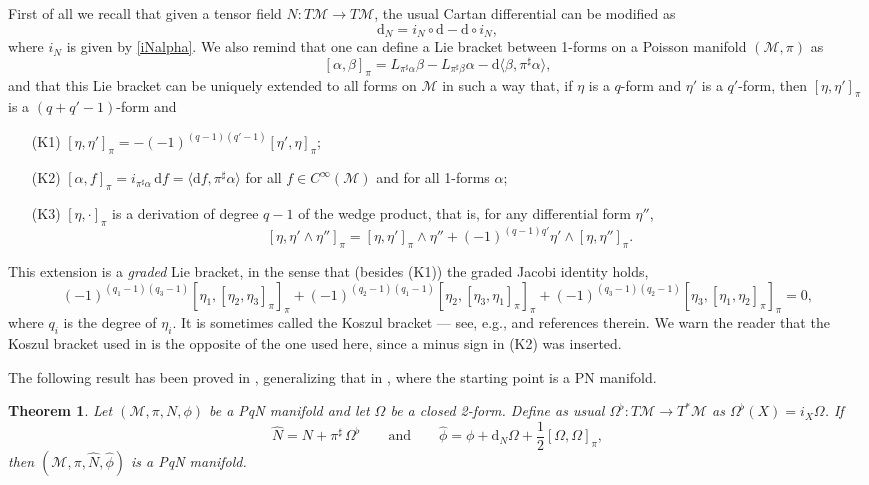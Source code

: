 \documentclass[12pt]{article}
\newtheorem{theorem}{Theorem}%
\def\d{{\mathrm d}}
\def\M{{\mathcal M}}
\begin{document}
First of all we recall that given a tensor field $N:T\M\to T\M$, the usual Cartan differential can be modified as 
\begin{equation}
\label{eq:dNd}
\d_N=i_N\circ \d-\d\circ i_N,
\end{equation}
where $i_N$ is given by \eqref{iNalpha}.
We also remind that one can define a Lie bracket between 1-forms on a Poisson manifold $(\M,\pi)$ as
\begin{equation}
\label{eq:liealgpi}
[\alpha,\beta]_\pi=L_{\pi^\sharp\alpha}\beta-L_{\pi^\sharp\beta}\alpha-\d\langle\beta,\pi^\sharp\alpha\rangle,
\end{equation}
and that this Lie bracket 
can be uniquely extended to all forms on $\M$ in such a way that, if $\eta$ is a $q$-form and $\eta'$ is a $q'$-form, then 
$[\eta,\eta']_\pi$ is a $(q+q'-1)$-form and 
\begin{itemize}
\item[(K1)] $[\eta,\eta']_\pi=-(-1)^{(q-1)(q'-1)}[\eta',\eta]_\pi$; 
\item[(K2)] $[\alpha,f]_\pi=i_{\pi^\sharp\alpha}\,\d f=\langle \d f,\pi^\sharp\alpha\rangle$ for all $f\in C^\infty(\M)$ and for all 1-forms $\alpha$;
\item[(K3)] 
$[\eta,\cdot]_\pi$ 
is a derivation of degree $q-1$ of the wedge product, that is, 
for any differential form $\eta''$,
\begin{equation}
\label{deriv-koszul}
[\eta,\eta'\wedge\eta'']_\pi=[\eta,\eta']_\pi\wedge\eta''+(-1)^{(q-1)q'}\eta'\wedge[\eta,\eta'']_\pi.
\end{equation}
\end{itemize}
This extension is a {\it graded\/} Lie bracket, in the sense that (besides (K1)) the graded Jacobi identity holds,
\begin{equation}
\label{graded-jacobi}
(-1)^{(q_1-1)(q_3-1)}[\eta_1,[\eta_2,\eta_3]_\pi]_\pi+(-1)^{(q_2-1)(q_1-1)}[\eta_2,[\eta_3,\eta_1]_\pi]_\pi+(-1)^{(q_3-1)(q_2-1)}[\eta_3,[\eta_1,\eta_2]_\pi]_\pi=0,
\end{equation}
where $q_i$ is the degree of $\eta_i$.
It is sometimes called the Koszul bracket --- see, e.g., \cite{FiorenzaManetti2012} and references therein. We warn the reader that the Koszul bracket used in \cite{FMOP2020} is the opposite of the one used here, since a minus sign in (K2) was inserted. 

The following result has been proved in \cite{DMP2024}, generalizing that in \cite{FMP2023}, where the starting point is a PN manifold.
\begin{theorem}
\label{thm:gim}
Let $(\M,\pi,N,\phi)$ be a PqN manifold and let $\Omega$ be a closed 2-form. Define as usual $\Omega^\flat:T\M\to T^*\M$ as 
$\Omega^\flat(X)=i_X\Omega$. If 
\begin{equation}
\label{N-phi-hat}
\widehat N=N+\pi^\sharp\,\Omega^\flat\qquad\mbox{and}\qquad\widehat\phi=\phi+\d_N\Omega+\frac{1}{2}[\Omega,\Omega]_\pi,
\end{equation} 
then $(\M,\pi,\widehat N,\widehat\phi)$ is a PqN manifold. 
\end{theorem}
\end{document}
